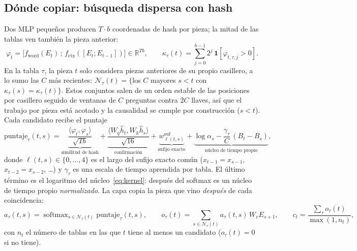 \documentclass[11pt]{article}
\newcommand{\Nset}{\mathcal{N}}
\DeclareMathOperator{\softmax}{softmax}
\begin{document}
\subsection{Dónde copiar: búsqueda dispersa con hash}
\label{sec:search}
Dos MLP pequeños producen $T\cdot b$ coordenadas de hash por pieza; la mitad de las tablas ven también la pieza
anterior:
\begin{equation}
\varphi_t=\big[f_{\mathrm{word}}(E_t)\,;\,f_{\mathrm{ctx}}([E_t;E_{t-1}])\big]\in\mathbb{R}^{Tb},\qquad
\kappa_\tau(t)=\sum_{j=0}^{b-1}2^j\,\mathbf{1}[\varphi_{t,\tau,j}>0].
\end{equation}
En la tabla $\tau$, la pieza $t$ solo considera piezas anteriores de su propio casillero, a lo sumo las $C$ más
recientes: $\Nset_\tau(t)=\{$los $C$ mayores $s<t$ con $\kappa_\tau(s)=\kappa_\tau(t)\}$. Estos conjuntos salen de un
orden estable de las posiciones por casillero seguido de ventanas de $C$ preguntas contra $2C$ llaves, así que el
trabajo por pieza está acotado y la causalidad se cumple por construcción ($s<t$). Cada candidato recibe el puntaje
\begin{equation}
\mathrm{puntaje}_\tau(t,s)=
\underbrace{\frac{\langle\varphi_t,\varphi_s\rangle}{\sqrt{Tb}}}_{\text{similitud de hash}}
+\underbrace{\frac{\langle W_q\hat h_t,W_k\hat h_s\rangle}{\sqrt{16}}}_{\text{confirmación}}
+\underbrace{w^{\mathrm{suf}}_{\ell(t,s)}}_{\text{sufijo exacto}}
+\underbrace{\log\alpha_s-\frac{\gamma_\tau}{C}\,(B_t-B_s)}_{\text{núcleo de tiempo propio}},
\label{eq:score}
\end{equation}
donde $\ell(t,s)\in\{0,\dots,4\}$ es el largo del sufijo exacto común ($x_{t-1}=x_{s-1}$, $x_{t-2}=x_{s-2}$, \dots)
y $\gamma_\tau$ es una escala de tiempo aprendida por tabla. El último término es el logaritmo del
núcleo~\eqref{eq:kernel}: después del softmax es un núcleo de tiempo propio \emph{normalizado}. La capa copia la pieza
que vino \emph{después} de cada coincidencia:
\begin{equation}
a_\tau(t,s)=\softmax_{s\in\Nset_\tau(t)}\mathrm{puntaje}_\tau(t,s),\qquad
o_\tau(t)=\sum_{s\in\Nset_\tau(t)}a_\tau(t,s)\,W_vE_{s+1},\qquad
c_t=\frac{\sum_\tau o_\tau(t)}{\max(1,n_t)},
\end{equation}
con $n_t$ el número de tablas en las que $t$ tiene al menos un candidato ($o_\tau(t)=0$ si no tiene).
\end{document}

